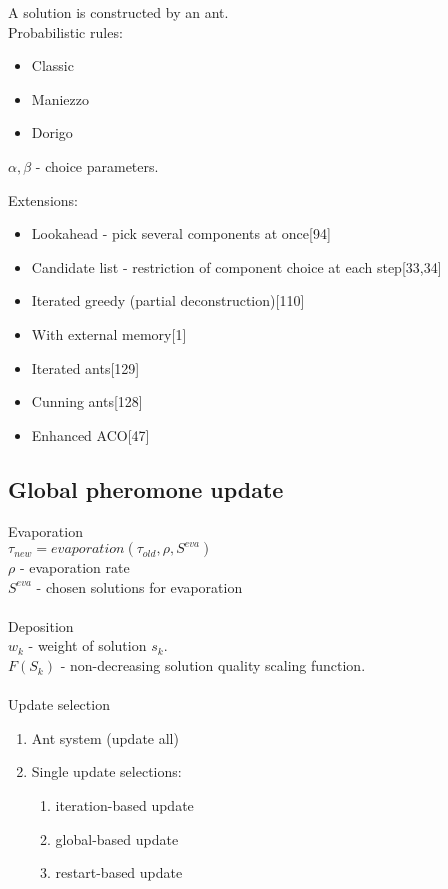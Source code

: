 \documentclass[12pt]{article}
\begin{document}
A solution is constructed by an ant. \\
Probabilistic rules: \\
\begin{itemize}
\item {Classic}
\item {Maniezzo}
\item {Dorigo}
\end{itemize}

$\alpha, \beta$ - choice parameters.

Extensions:
\begin{itemize}
\item {Lookahead - pick several components at once[94]}
\item {Candidate list - restriction of component choice at each step[33,34]}
\item {Iterated greedy (partial deconstruction)[110]}
\item {With external memory[1]}
\item {Iterated ants[129]}
\item {Cunning ants[128]}
\item {Enhanced ACO[47]}
\end{itemize}

\subsection{Global pheromone update}
Evaporation \\
$\tau_{new}=evaporation(\tau_{old}, \rho, S^{eva})$ \\
$\rho$ - evaporation rate \\
$S^{eva}$ - chosen solutions for evaporation \\ \\

Deposition \\
$w_k$ - weight of solution $s_k$. \\
$F(S_k)$ - non-decreasing solution quality scaling function. \\ \\

Update selection
\begin{enumerate}
\item {Ant system (update all)}
\item {Single update selections:}
\begin{enumerate}
\item {iteration-based update}
\item {global-based update}
\item {restart-based update}
\end{enumerate}
\end{enumerate}
\end{document}
